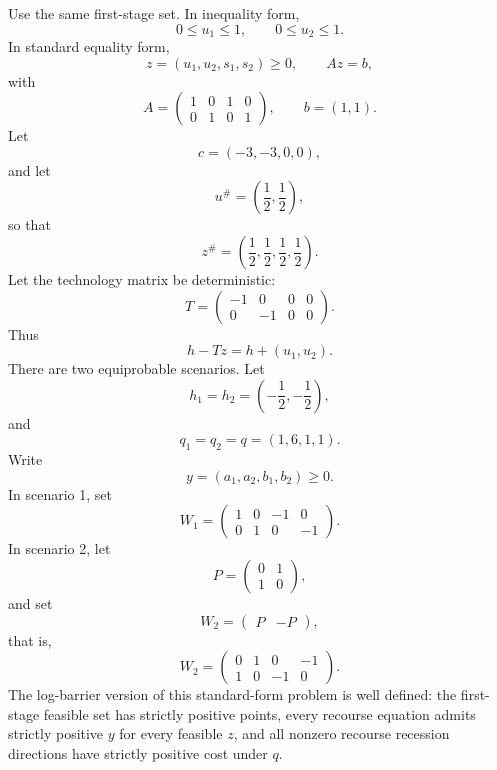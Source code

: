 \documentclass{article}
\newcommand{\1}{\mathbf{1}}
\theoremstyle{plain}
\theoremstyle{definition}
\theoremstyle{remark}
\begin{document}
Use the same first-stage set. In inequality form,
\[
0\leq u_1\leq 1,
\qquad
0\leq u_2\leq 1.
\]
In standard equality form,
\[
z=(u_1,u_2,s_1,s_2)\geq 0,
\qquad
Az=b,
\]
with
\[
A=
\begin{pmatrix}
1&0&1&0\\
0&1&0&1
\end{pmatrix},
\qquad
b=(1,1).
\]
Let
\[
c=(-3,-3,0,0),
\]
and let
\[
u^\#=\left(\frac{1}{2},\frac{1}{2}\right),
\]
so that
\[
z^\#=\left(\frac{1}{2},\frac{1}{2},\frac{1}{2},\frac{1}{2}\right).
\]
Let the technology matrix be deterministic:
\[
T=
\begin{pmatrix}
-1&0&0&0\\
0&-1&0&0
\end{pmatrix}.
\]
Thus
\[
h-Tz=h+(u_1,u_2).
\]
There are two equiprobable scenarios. Let
\[
h_1=h_2=\left(-\frac{1}{2},-\frac{1}{2}\right),
\]
and
\[
q_1=q_2=q=(1,6,1,1).
\]
Write
\[
y=(a_1,a_2,b_1,b_2)\geq 0.
\]
In scenario 1, set
\[
W_1=
\begin{pmatrix}
1&0&-1&0\\
0&1&0&-1
\end{pmatrix}.
\]
In scenario 2, let
\[
P=
\begin{pmatrix}
0&1\\
1&0
\end{pmatrix},
\]
and set
\[
W_2=\begin{pmatrix}P&-P\end{pmatrix},
\]
that is,
\[
W_2=
\begin{pmatrix}
0&1&0&-1\\
1&0&-1&0
\end{pmatrix}.
\]
The log-barrier version of this standard-form problem is well defined: the first-stage feasible set has strictly positive points, every recourse equation admits strictly positive $y$ for every feasible $z$, and all nonzero recourse recession directions have strictly positive cost under $q$.
\end{document}
